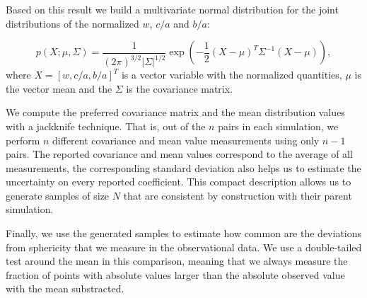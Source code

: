 \documentclass[a4paper,fleqn,usenatbib]{mnras}
\begin{document}
Based on this result we build a multivariate normal distribution for
the joint distributions of the normalized $w$, $c/a$ and $b/a$:

\begin{equation}
p(X; \mu, \Sigma) = \frac{1}{(2\pi)^{3/2}|\Sigma|^{1/2}}
\exp\left(-\frac{1}{2}(X-\mu)^{T}\Sigma^{-1}(X-\mu)\right), 
\label{eq:multivariate}
\end{equation}
% 
where $X=[w, c/a, b/a]^{T}$ is a vector variable with the normalized
quantities, $\mu$ is the vector mean and the $\Sigma$ is the
covariance matrix.  


We compute the preferred covariance matrix and the mean distribution values
with a jackknife technique. 
That is, out of the $n$ pairs in each simulation, we perform $n$
different covariance and mean value measurements using only $n-1$ pairs. 
The reported covariance and mean values correspond to the average of
all measurements, the corresponding standard deviation also helps us to
estimate the uncertainty on every reported coefficient.
This compact description allows us to generate samples of size $N$
that are consistent by construction with their parent simulation. 

Finally, we use the generated samples to estimate how
common are the deviations from sphericity that we measure in the
observational data.  
We use a double-tailed test around the mean in this comparison, meaning that we
always measure the fraction of points with absolute values larger than the
absolute observed value with the mean substracted. 


\end{document}
